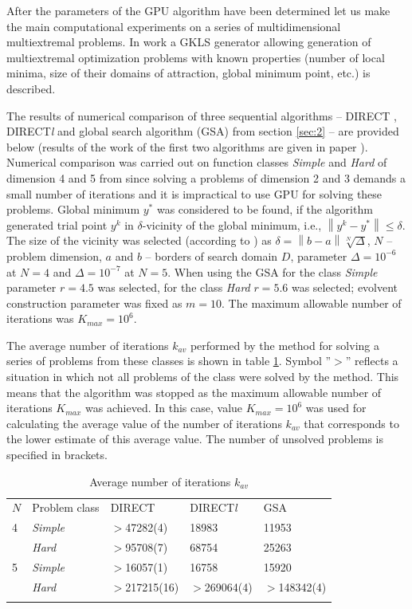 \documentclass[smallcondensed]{svjour3}     %
\begin{document}
After the parameters of the GPU algorithm have been determined let us make the main computational experiments on a series of multidimensional multiextremal problems. In work \cite{RefGaviano} a GKLS generator allowing generation of multiextremal optimization problems with known properties (number of local minima, size of their domains of attraction, global minimum point, etc.) is described.  

The results of numerical comparison of three sequential algorithms -- DIRECT \cite{RefJones}, DIRECT\textit{l} \cite{RefGablonsky} and global search algorithm (GSA) from section \ref{sec:2} -- are provided below (results of the work of the first two algorithms are given in paper \cite{RefGaviano}). Numerical comparison was carried out on function classes \textit{Simple} and \textit{Hard} of dimension 4 and 5 from \cite{RefGaviano} since solving a problems of dimension 2 and 3 demands a small number of iterations and it is impractical to use GPU for solving these problems. Global minimum $y^\ast$ was considered to be found, if the algorithm generated trial point $y^k$ in $\delta$-vicinity of the global minimum, i.e., $\left\|y^k-y^\ast\right\|\leq\delta$. The size of the vicinity was selected (according to \cite{RefGaviano}) as $\delta = \left\|b-a\right\|\sqrt[N]{\Delta}$, $N$ -- problem dimension, $a$ and $b$ -- borders of search domain $D$, parameter $\Delta=10^{-6}$ at $N=4$ and $\Delta=10^{-7}$ at $N=5$. When using the GSA for the class \textit{Simple} parameter $r=4.5$ was selected, for the class \textit{Hard} $r=5.6$ was selected; evolvent construction parameter was fixed as $m=10$. The maximum allowable number of iterations was $K_{max} = 10^6$.

The average number of iterations $k_{av}$ performed by the method for solving a series of problems from these classes is shown in table \ref{tab:3}. Symbol ''$>$''  reflects a situation in which not all problems of the class were solved by the method. This means that the algorithm was stopped as the maximum allowable number of iterations $K_{max}$ was achieved. In this case, value $K_{max}=10^6$ was used for calculating the average value of the number of iterations $k_{av}$ that corresponds to the lower estimate of this average value. The number of unsolved problems is specified in brackets.

\begin{table}
	\caption{Average number of iterations $k_{av}$}
	\label{tab:3}
	\center
	\begin{tabular}{lllll}
		\hline\noalign{\smallskip}
  	 $N$ & Problem class & DIRECT & DIRECT\textit{l} & GSA \\
		\noalign{\smallskip} \hline \noalign{\smallskip}
			4 &	\textit{Simple}	& $>$47282(4) &	18983 &	11953 \\
	      & \textit{Hard} &	$>$95708(7) &	68754 &	25263 \\
			5	& \textit{Simple} &	$>$16057(1) &	16758 &	15920 \\
				& \textit{Hard} &	$>$217215(16) &	$>$269064(4) & $>$148342(4) \\
		\noalign{\smallskip}\hline
	\end{tabular}
\end{table}
\end{document}
